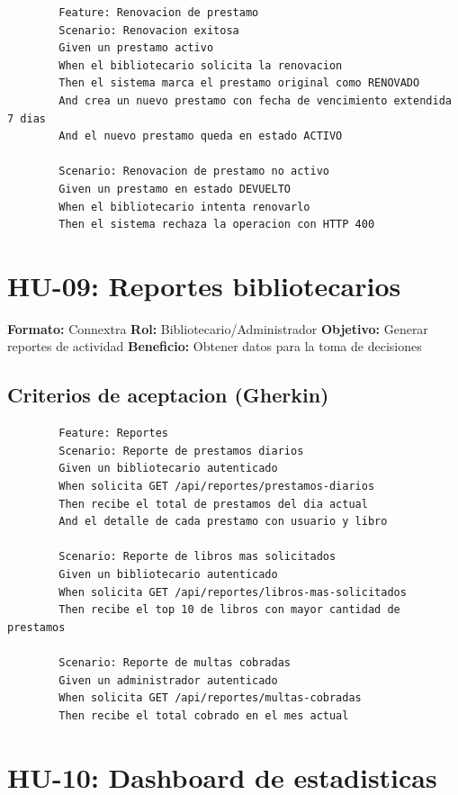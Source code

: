 \documentclass[
11pt,
a4paper,
]{report}
\begin{document}
	\begin{lstlisting}
		Feature: Renovacion de prestamo
		Scenario: Renovacion exitosa
		Given un prestamo activo
		When el bibliotecario solicita la renovacion
		Then el sistema marca el prestamo original como RENOVADO
		And crea un nuevo prestamo con fecha de vencimiento extendida 7 dias
		And el nuevo prestamo queda en estado ACTIVO
		
		Scenario: Renovacion de prestamo no activo
		Given un prestamo en estado DEVUELTO
		When el bibliotecario intenta renovarlo
		Then el sistema rechaza la operacion con HTTP 400
	\end{lstlisting}
	
	\hypertarget{hu-09-reportes-bibliotecarios}{%
		\section{HU-09: Reportes bibliotecarios}\label{hu-09-reportes-bibliotecarios}}
	
	\textbf{Formato:} Connextra
	\textbf{Rol:} Bibliotecario/Administrador
	\textbf{Objetivo:} Generar reportes de actividad
	\textbf{Beneficio:} Obtener datos para la toma de decisiones
	
	\hypertarget{criterios-de-aceptacion-gherkin-3}{%
		\subsection{Criterios de aceptacion (Gherkin)}\label{criterios-de-aceptacion-gherkin-3}}
	
	\begin{lstlisting}
		Feature: Reportes
		Scenario: Reporte de prestamos diarios
		Given un bibliotecario autenticado
		When solicita GET /api/reportes/prestamos-diarios
		Then recibe el total de prestamos del dia actual
		And el detalle de cada prestamo con usuario y libro
		
		Scenario: Reporte de libros mas solicitados
		Given un bibliotecario autenticado
		When solicita GET /api/reportes/libros-mas-solicitados
		Then recibe el top 10 de libros con mayor cantidad de prestamos
		
		Scenario: Reporte de multas cobradas
		Given un administrador autenticado
		When solicita GET /api/reportes/multas-cobradas
		Then recibe el total cobrado en el mes actual
	\end{lstlisting}
	
	\hypertarget{hu-10-dashboard-de-estadisticas}{%
		\section{HU-10: Dashboard de estadisticas}\label{hu-10-dashboard-de-estadisticas}}
	
\end{document}
